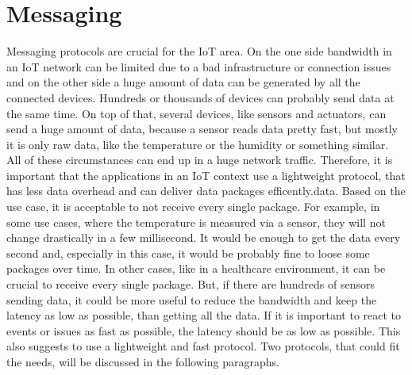 \section{Messaging}
Messaging protocols are crucial for the \ac{IoT} area.
On the one side bandwidth in an \ac{IoT} network can be limited due to a bad infrastructure or connection issues and on the other side a huge amount of data can be generated by all the connected devices.\autocite[cf.][p. 71]{Luzuriaga:2017}
Hundreds or thousands of devices can probably send data at the same time.\autocite[cf.][p. 71]{Luzuriaga:2017}
On top of that, several devices, like sensors and actuators, can send a huge amount of data, because a sensor reads data pretty fast, but mostly it is only raw data, like the temperature or the humidity or something similar.
All of these circumstances can end up in a huge network traffic.
Therefore, it is important that the applications in an \ac{IoT} context use a lightweight protocol, that has less data overhead and can deliver data packages efficently.data.\autocite[cf.][p. 2 f.]{Kraijak:2015}
Based on the use case, it is acceptable to not receive every single package.
For example, in some use cases, where the temperature is measured via a sensor, they will not change drastically in a few millisecond.
It would be enough to get the data every second and, especially in this case, it would be probably fine to loose some packages over time.
In other cases, like in a healthcare environment, it can be crucial to receive every single package.\autocite[cf.][p. 502]{Hedi:2017}
But, if there are hundreds of sensors sending data, it could be more useful to reduce the bandwidth and keep the latency as low as possible, than getting all the data.\autocite[cf.][p. 2 f.]{Kraijak:2015}
If it is important to react to events or issues as fast as possible, the latency should be as low as possible.\autocite[cf.][p. 502]{Hedi:2017}
This also suggests to use a lightweight and fast protocol.
Two protocols, that could fit the needs, will be discussed in the following paragraphs.

